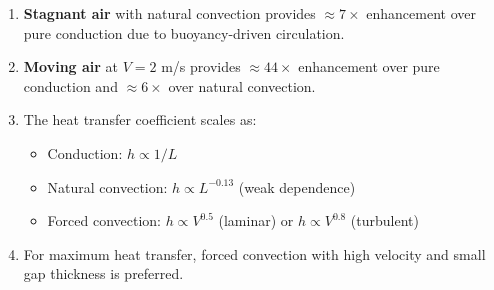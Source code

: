 \documentclass[11pt]{article}
\begin{document}
\begin{enumerate}
    \item \textbf{Stagnant air} with natural convection provides $\approx 7\times$ enhancement over pure conduction due to buoyancy-driven circulation.

    \item \textbf{Moving air} at $V = 2$ m/s provides $\approx 44\times$ enhancement over pure conduction and $\approx 6\times$ over natural convection.

    \item The heat transfer coefficient scales as:
    \begin{itemize}
        \item Conduction: $h \propto 1/L$
        \item Natural convection: $h \propto L^{-0.13}$ (weak dependence)
        \item Forced convection: $h \propto V^{0.5}$ (laminar) or $h \propto V^{0.8}$ (turbulent)
    \end{itemize}

    \item For maximum heat transfer, forced convection with high velocity and small gap thickness is preferred.
\end{enumerate}
\end{document}
